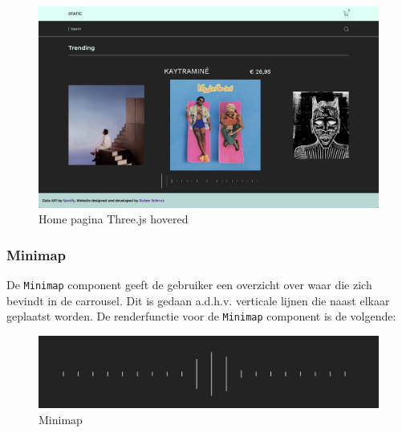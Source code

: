 \begin{figure}
	\centering
	\includegraphics[width=1\linewidth]{graphics/desktopHomeThreeHovered}
	\caption[Home pagina Three.js hovered]{Home pagina Three.js hovered}
	\label{fig:desktopHomeThreeHovered}
\end{figure}

\subsubsection{Minimap}

De \texttt{Minimap} component geeft de gebruiker een overzicht over waar die zich bevindt in de carrousel. Dit is gedaan a.d.h.v. verticale lijnen die naast elkaar geplaatst worden. De renderfunctie voor de \texttt{Minimap} component is de volgende: 

\begin{figure}
	\centering
	\includegraphics[width=1\linewidth]{graphics/minimap}
	\caption[Minimap]{Minimap}
	\label{fig:minimap}
\end{figure}


